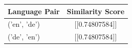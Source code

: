 \begin{tabular}{|l|c|}
\hline
Language Pair & Similarity Score \\
\hline
('en', 'de') & [[0.74807584]] \\
('de', 'en') & [[0.74807584]] \\
\hline
\end{tabular}

